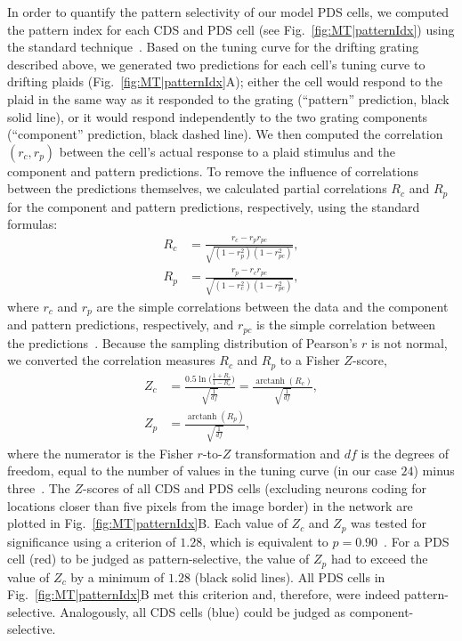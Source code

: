 In order to quantify the pattern selectivity of our model
\ac{PDS} cells, we computed the pattern index for each \ac{CDS} and
\ac{PDS} cell (see Fig.~\ref{fig:MT|patternIdx})
using the standard 
technique~\citep{Movshon1985,MovshonNewsome1996,Smith2005}.
Based on the tuning curve for the drifting grating described
above, we generated two predictions for each cell's tuning
curve to drifting plaids (Fig.~\ref{fig:MT|patternIdx}A); 
either the cell would respond
to the plaid in the same way as it responded to the grating
(``pattern'' prediction, black solid line), or it would respond
independently to the two grating components (``component''
prediction, black dashed line). We then computed the correlation
$(r_c, r_p)$ between the cell's actual response to a plaid stimulus
and the component and pattern predictions. To remove
the influence of correlations between the predictions themselves,
we calculated partial correlations $R_c$ and $R_p$ for the
component and pattern predictions, respectively, using the
standard formulas:
\begin{align}
R_c & = \frac{r_c - r_p r_{pc}}{\sqrt{(1-r_p^2)(1-r_{pc}^2)}}, \label{eqn:MT|Rc} \\
R_p & = \frac{r_p - r_c r_{pc}}{\sqrt{(1-r_c^2)(1-r_{pc}^2)}}, \label{eqn:MT|Rp}
\end{align}
where $r_c$ and $r_p$ are the simple correlations between the data
and the component and pattern predictions, respectively, and
$r_{pc}$ is the simple correlation between the 
predictions~\citep{MovshonNewsome1996}.
Because the sampling distribution of
Pearson's $r$ is not normal, we converted the correlation measures
$R_c$ and $R_p$ to a Fisher $Z$-score,
\begin{align}
Z_c & = 
	\frac{
    	0.5 \ln\big( \frac{1+R_c}{1-R_c} \big)
    }{
    	\sqrt{ \frac{1}{df} }
    } = \frac{
    	\operatorname{arctanh}(R_c)
    }{
    	\sqrt{\frac{1}{df}}
    }, \label{eqn:MT|Zc} \\
Z_p & = 
	\frac{
    	\operatorname{arctanh}(R_p)
    }{
    	\sqrt{\frac{1}{df}}
    }, \label{eqn:MT|Zp}
\end{align}
where the numerator is the Fisher $r$-to-$Z$ transformation and
$df$ is the degrees of freedom, equal to the number of values in
the tuning curve (in our case $24$) minus three~\citep{Smith2005}.
The $Z$-scores of all \ac{CDS} and \ac{PDS} cells (excluding
neurons coding for locations closer than five pixels from the
image border) in the network are plotted in Fig.~\ref{fig:MT|patternIdx}B.
Each value of $Z_c$ and $Z_p$ was tested for significance 
using a criterion of $1.28$, which is equivalent to 
$p=0.90$~\citep{Smith2005}. For a \ac{PDS} cell (red) to be judged as
pattern-selective, the value of $Z_p$
had to exceed the value of $Z_c$ by a minimum of $1.28$ (black
solid lines). All \ac{PDS} cells in Fig.~\ref{fig:MT|patternIdx}B
met this criterion and, therefore, were indeed pattern-selective.
Analogously, all \ac{CDS} cells (blue) could be judged as 
component-selective.


